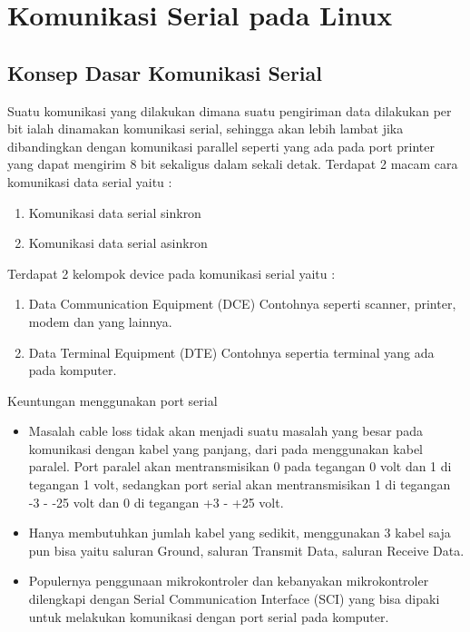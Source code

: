 
\section{Komunikasi Serial pada Linux}
	
	\subsection{Konsep Dasar Komunikasi Serial}
	Suatu komunikasi yang dilakukan dimana suatu pengiriman data dilakukan per bit ialah dinamakan komunikasi serial, sehingga akan lebih lambat jika dibandingkan dengan komunikasi parallel seperti yang ada pada port printer yang dapat mengirim 8 bit sekaligus dalam sekali detak.
	Terdapat 2 macam cara komunikasi data serial yaitu :
		\begin{enumerate}
			\item Komunikasi data serial sinkron
			\item Komunikasi data serial asinkron
		\end{enumerate}
	
	Terdapat 2 kelompok device pada komunikasi serial yaitu :
		\begin{enumerate}
			\item Data Communication Equipment (DCE)
			Contohnya seperti scanner, printer, modem dan yang lainnya.
			\item Data Terminal Equipment (DTE)
			Contohnya sepertia terminal yang ada pada komputer.
		\end{enumerate}
	
	Keuntungan menggunakan port serial
		\begin{itemize}
			\item Masalah cable loss tidak akan menjadi suatu masalah yang besar pada komunikasi dengan kabel yang panjang, dari pada menggunakan kabel paralel. Port paralel akan mentransmisikan 0 pada tegangan 0 volt dan 1 di tegangan 1 volt, sedangkan port serial akan mentransmisikan 1 di tegangan -3 - -25 volt dan 0 di tegangan +3 - +25 volt.
			\item Hanya membutuhkan jumlah kabel yang sedikit, menggunakan 3 kabel saja pun bisa yaitu saluran Ground, saluran Transmit Data, saluran Receive Data.
			\item Populernya penggunaan mikrokontroler dan kebanyakan mikrokontroler dilengkapi dengan Serial Communication Interface (SCI) yang bisa dipaki untuk melakukan komunikasi dengan port serial pada komputer.
		\end{itemize}
		
